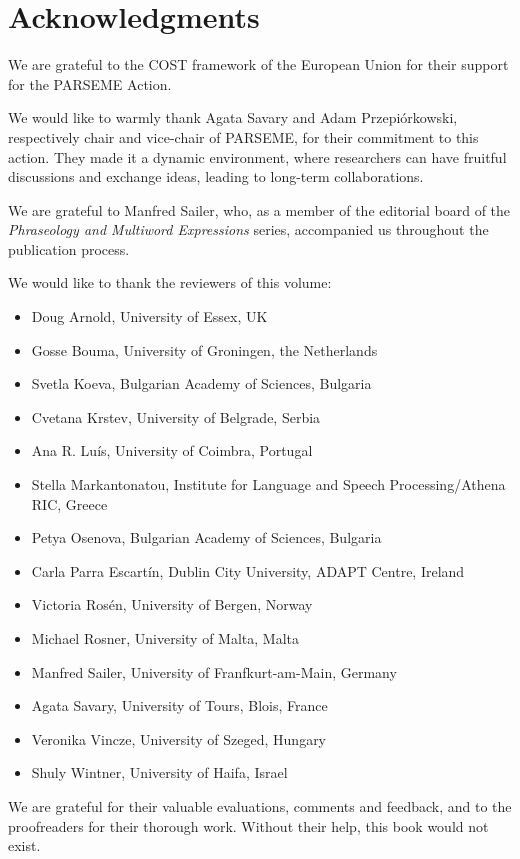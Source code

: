 \documentclass[output=paper]{langsci/langscibook}
\begin{document}
\section{Acknowledgments}
We are grateful to the COST framework of the European Union for their
support for the PARSEME Action.

We would like to warmly thank Agata Savary and Adam Przepiórkowski,
respectively chair and vice-chair of PARSEME, for their commitment to
this action. They made it a dynamic environment, where researchers can
have fruitful discussions and exchange ideas, leading to long-term
collaborations.

We are grateful to Manfred Sailer, who, as a member of the editorial
board of the \emph{Phraseology and Multiword Expressions} series,
accompanied us throughout the publication process.

We would like to thank the reviewers of this volume:
\begin{itemize}
\item Doug Arnold, University of Essex, UK
\item Gosse Bouma, University of Groningen, the Netherlands
\item Svetla Koeva, Bulgarian Academy of Sciences, Bulgaria
\item Cvetana Krstev, University of Belgrade, Serbia
\item Ana R. Lu\'is, University of Coimbra, Portugal 
\item Stella Markantonatou,  Institute for Language and Speech Processing/Athena RIC, Greece
\item Petya Osenova, Bulgarian Academy of Sciences, Bulgaria
\item Carla Parra Escart\'in, Dublin City University, ADAPT Centre, Ireland
\item Victoria Ros\'en, University of Bergen, Norway
\item Michael Rosner, University of Malta, Malta
\item Manfred Sailer, University of Franfkurt-am-Main, Germany
\item Agata Savary, University of Tours, Blois, France
\item Veronika Vincze, University of Szeged, Hungary
\item Shuly Wintner, University of Haifa, Israel
\end{itemize}

We are grateful for their valuable evaluations, comments and feedback,
and to the proofreaders for their thorough work. Without their help,
this book would not exist.
\end{document}
